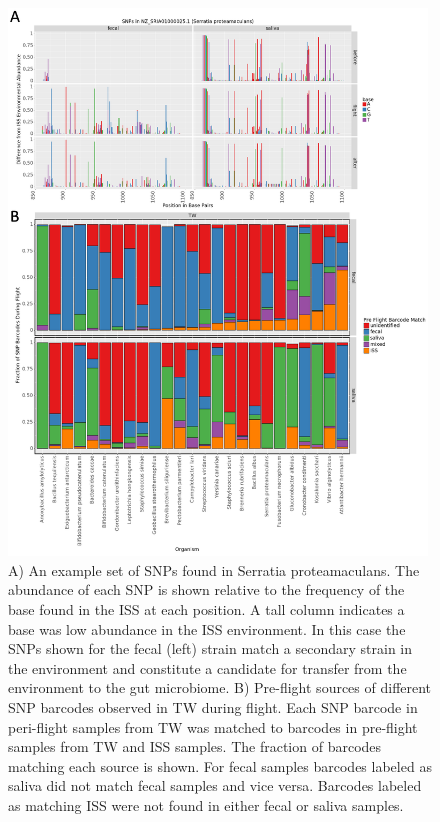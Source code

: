 \begin{figure}
  \begin{center}
    \includegraphics[width=0.99\textwidth]{figs/snp_bcs.png}
	\caption{\small{
	    A) An example set of SNPs found in Serratia proteamaculans. The abundance of each SNP is shown relative to the frequency of the base found in the ISS at each position. A tall column indicates a base was low abundance in the ISS environment. In this case the SNPs shown for the fecal (left) strain match a secondary strain in the environment and constitute a candidate for transfer from the environment to the gut microbiome.
	    B) Pre-flight sources of different SNP barcodes observed in TW during flight. Each SNP barcode in peri-flight samples from TW was matched to barcodes in pre-flight samples from TW and ISS samples. The fraction of barcodes matching each source is shown. For fecal samples barcodes labeled as saliva did not match fecal samples and vice versa. Barcodes labeled as matching ISS were not found in either fecal or saliva samples.
	}}
    \label{fig:bcsources}
  \end{center}
\end{figure}


